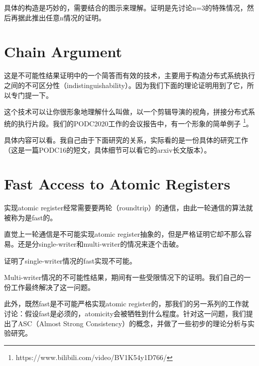 具体的构造是巧妙的，需要结合\cite[Sec 5.2.3]{Attiya04}的图示来理解。证明是先讨论n=3的特殊情况，然后再据此推出任意n情况的证明。

\section{Chain Argument}

这是不可能性结果证明中的一个简答而有效的技术，主要用于构造分布式系统执行之间的不可区分性（indistinguishability）。因为我们下面的理论证明用到了它，所以专门提一下。

这个技术可以让你很形象地理解什么叫做，以一个剪辑导演的视角，拼接分布式系统的执行片段。我们的PODC2020工作的会议报告中，有一个形象的简单例子 \footnote{https://www.bilibili.com/video/BV1K54y1D766/}。

具体内容可以看\cite[Chap 2]{Attiya14}。我自己由于下面研究的关系，实际看的是一份具体的研究工作\cite{Hadjistasi16}（这是一篇PODC16的短文，具体细节可以看它的arxiv长文版本）。

\section{Fast Access to Atomic Registers}

实现atomic register经常需要要两轮（roundtrip）的通信，由此一轮通信的算法就被称为是fast的。

直觉上一轮通信是不可能实现atomic register抽象的，但是严格证明它却不那么容易。还是分single-writer和multi-writer的情况来逐个击破。

\cite{Dutta10}证明了single-writer情况的fast实现不可能。

Multi-writer情况的不可能性结果，期间有一些受限情况下的证明。我们自己的一份工作最终解决了这一问题\cite{Huang20}。

此外，既然fast是不可能严格实现atomic register的，那我们的另一系列的工作就讨论：假设fast是必须的，atomicity会被牺牲到什么程度。针对这一问题，我们提出了ASC（Almost Strong Consistency）的概念，并做了一些初步的理论分析与实验研究\cite{Wei17, Ouyang21}。
